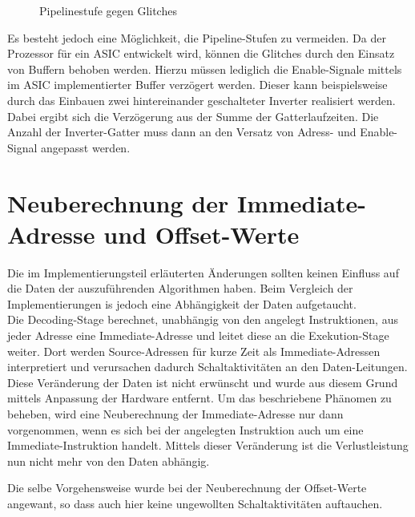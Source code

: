 \begin{figure}[H] 
	\centering
	
	\caption{Pipelinestufe gegen Glitches}
	\label{fig:glitches_pipeline}
\end{figure}


Es besteht jedoch eine Möglichkeit, die Pipeline-Stufen zu vermeiden.
Da der Prozessor für ein ASIC entwickelt wird, können die Glitches durch den Einsatz von Buffern behoben werden. Hierzu müssen lediglich die Enable-Signale mittels im ASIC implementierter Buffer verzögert werden. Dieser kann beispielsweise durch das Einbauen zwei hintereinander geschalteter Inverter realisiert werden. Dabei ergibt sich die Verzögerung aus der Summe der Gatterlaufzeiten. Die Anzahl der Inverter-Gatter muss dann an den Versatz von Adress- und Enable-Signal angepasst werden.

\section{Neuberechnung der Immediate-Adresse und Offset-Werte}
Die im Implementierungsteil erläuterten Änderungen sollten keinen Einfluss auf die Daten der auszuführenden Algorithmen haben. Beim Vergleich der Implementierungen is jedoch eine Abhängigkeit der Daten aufgetaucht.\\
Die Decoding-Stage berechnet, unabhängig von den angelegt Instruktionen, aus jeder Adresse eine Immediate-Adresse und leitet diese an die Exekution-Stage weiter. Dort werden Source-Adressen für kurze Zeit als Immediate-Adressen interpretiert und verursachen dadurch Schaltaktivitäten an den Daten-Leitungen. Diese Veränderung der Daten ist nicht erwünscht und wurde aus diesem Grund mittels Anpassung der Hardware entfernt. Um das beschriebene Phänomen zu beheben,  wird eine Neuberechnung der Immediate-Adresse nur dann vorgenommen, wenn es sich bei der angelegten Instruktion auch um eine Immediate-Instruktion handelt.
Mittels dieser Veränderung ist die Verlustleistung nun nicht mehr von den Daten abhängig.

Die selbe Vorgehensweise wurde bei der Neuberechnung der Offset-Werte angewant, so dass auch hier keine ungewollten Schaltaktivitäten auftauchen.



